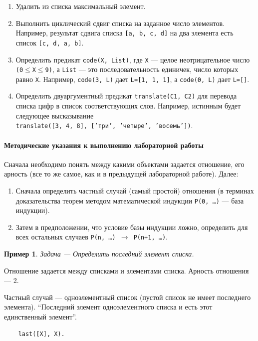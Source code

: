 \documentclass[12pt, openany, oneside]{book} %
\newtheorem{example}{Пример}[chapter]
\begin{document}
\begin{enumerate}
\item Удалить из списка максимальный элемент.
\item Выполнить циклический сдвиг списка на заданное число элементов. Например, результат сдвига списка {\tt [a, b, c, d]} на два элемента есть список {\tt [c, d, a, b]}.
\item Определить предикат {\tt code(Х, List)}, где {\tt Х} --- целое неотрицательное число {\tt (0}$\leq${\tt X}$\leq${\tt 9)}, а {\tt List} --- это последовательность  единичек, число  которых  равно  {\tt Х}.  Например, {\tt code(3, L)} дает {\tt L=[1, 1, 1]}, а {\tt code(0, L)} дает {\tt L=[]}.
\item Определить двуаргументный предикат {\tt translate(С1, С2)} для перевода списка цифр в список соответствующих слов. Например, истинным будет следующее высказывание\\
     {\tt translate([3, 4, 8], ['три', 'четыре', 'восемь'])}.
\end{enumerate}

\paragraph{Методические указания к выполнению лабораторной работы}
  Сначала необходимо понять между какими объектами задается отношение, его арность (все то же самое, как и в предыдущей лабораторной работе). Далее:
  \begin{enumerate}
  \item Сначала определить частный случай (самый простой) отношения (в терминах доказательства теорем методом математической индукции {\tt P(0, \ldots)} --- база индукции).
  \item Затем в предположении, что условие базы индукции ложно, определить для всех остальных случаев {\tt P(n, \ldots) $\to$ P(n+1, \ldots)}.
  \end{enumerate}

\begin{example}
  Задача --- Определить последний элемент списка.
\end{example}
  Отношение задается между списками и элементами списка. Арность отношения --- 2.

Частный случай --- одноэлементный список (пустой список не имеет последнего элемента). ``Последний элемент одноэлементного списка и есть этот единственный элемент''.

{\tt\begin{verbatim}
    last([X], X).
\end{verbatim}}
\end{document}
